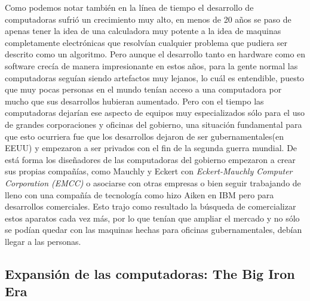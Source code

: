 \documentclass[letterpaper,12pt,oneside]{book}
\begin{document}
		
		
		Como podemos notar también en la línea de tiempo el desarrollo de computadoras sufrió un crecimiento muy alto, en menos de 20 años se paso de apenas tener la idea
		de una calculadora muy potente a la idea de maquinas completamente electrónicas que resolvían cualquier problema
		que pudiera ser descrito como un algoritmo. Pero aunque el desarrollo tanto en hardware como en software crecía de manera impresionante en
		estos años, para la gente normal las computadoras seguían siendo artefactos muy lejanos, lo cuál es entendible, puesto que
		muy pocas personas en el mundo tenían acceso a una computadora por mucho que sus desarrollos hubieran aumentado. Pero con el tiempo las computadoras
		dejarían ese aspecto de equipos muy especializados sólo para el uso de grandes corporaciones y oficinas del gobierno, una situación fundamental
		para que esto ocurriera fue que los desarrollos dejaron de ser gubernamentales(en EEUU) y empezaron a ser privados con el fin de la segunda guerra mundial.
		De está forma los diseñadores de las computadoras del gobierno empezaron a crear sus propias compañías, como Mauchly y Eckert
		con \textit{Eckert-Mauchly Computer Corporation (EMCC)} o asociarse con otras empresas o bien seguir trabajando de lleno con una compañía de tecnología como
		hizo Aiken en IBM pero para desarrollos comerciales. Esto trajo como resultado la búsqueda de comercializar estos aparatos cada vez más, por lo que tenían que ampliar 
		el mercado y no sólo
		se podían quedar con las maquinas hechas para oficinas gubernamentales, debían llegar a las personas.
		
		
		\clearpage
		
		\subsection{Expansión de las computadoras: The Big Iron Era}
		
		
\end{document}
